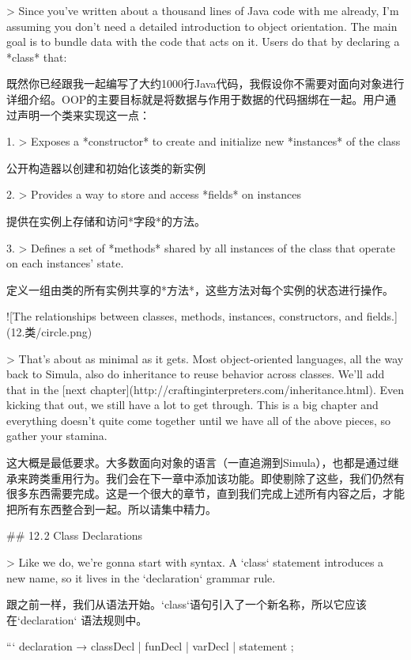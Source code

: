 \documentclass[cn,11pt,chinese]{elegantbook}
\begin{document}
{{{{{{{{{{{{{{{{{{> Since you’ve written about a thousand lines of Java code with me already, I’m assuming you don’t need a detailed introduction to object orientation. The main goal is to bundle data with the code that acts on it. Users do that by declaring a *class* that:

既然你已经跟我一起编写了大约1000行Java代码，我假设你不需要对面向对象进行详细介绍。OOP的主要目标就是将数据与作用于数据的代码捆绑在一起。用户通过声明一个类来实现这一点：

1. > Exposes a *constructor* to create and initialize new *instances* of the class

   公开构造器以创建和初始化该类的新实例

2. > Provides a way to store and access *fields* on instances

   提供在实例上存储和访问*字段*的方法。

3. > Defines a set of *methods* shared by all instances of the class that operate on each instances’ state.

   定义一组由类的所有实例共享的*方法*，这些方法对每个实例的状态进行操作。

![The relationships between classes, methods, instances, constructors, and fields.](12.类/circle.png)

> That’s about as minimal as it gets. Most object-oriented languages, all the way back to Simula, also do inheritance to reuse behavior across classes. We’ll add that in the [next chapter](http://craftinginterpreters.com/inheritance.html). Even kicking that out, we still have a lot to get through. This is a big chapter and everything doesn’t quite come together until we have all of the above pieces, so gather your stamina.

这大概是最低要求。大多数面向对象的语言（一直追溯到Simula），也都是通过继承来跨类重用行为。我们会在下一章中添加该功能。即使剔除了这些，我们仍然有很多东西需要完成。这是一个很大的章节，直到我们完成上述所有内容之后，才能把所有东西整合到一起。所以请集中精力。

## 12 . 2 Class Declarations

> Like we do, we’re gonna start with syntax. A `class` statement introduces a new name, so it lives in the `declaration` grammar rule.

跟之前一样，我们从语法开始。`class`语句引入了一个新名称，所以它应该在`declaration` 语法规则中。

```
declaration    → classDecl
               | funDecl
               | varDecl
               | statement ;

}}}}}}}}}}}}}}}}}}
\end{document}

